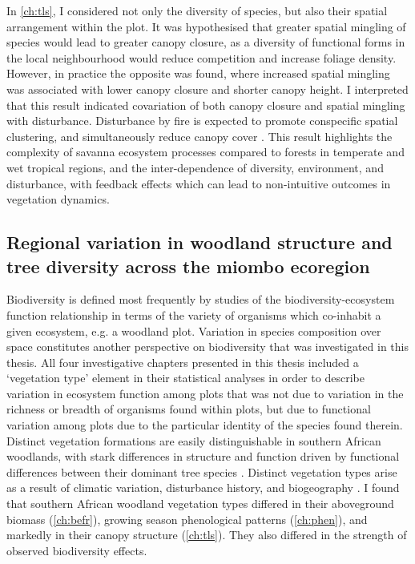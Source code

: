 \begin{refsection}
In \autoref{ch:tls}, I considered not only the diversity of species, but also their spatial arrangement within the plot. It was hypothesised that greater spatial mingling of species would lead to greater canopy closure, as a diversity of functional forms in the local neighbourhood would reduce competition and increase foliage density. However, in practice the opposite was found, where increased spatial mingling was associated with lower canopy closure and shorter canopy height. I interpreted that this result indicated covariation of both canopy closure and spatial mingling with disturbance. Disturbance by fire is expected to promote conspecific spatial clustering, and simultaneously reduce canopy cover \citep{}. This result highlights the complexity of savanna ecosystem processes compared to forests in temperate and wet tropical regions, and the inter-dependence of diversity, environment, and disturbance, with feedback effects which can lead to non-intuitive outcomes in vegetation dynamics.

\subsection{Regional variation in woodland structure and tree diversity across the miombo ecoregion}
\label{discussion:ssec:veg_type}

Biodiversity is defined most frequently by studies of the biodiversity-ecosystem function relationship in terms of the variety of organisms which co-inhabit a given ecosystem, e.g. a woodland plot. Variation in species composition over space constitutes another perspective on biodiversity that was investigated in this thesis. All four investigative chapters presented in this thesis included a `vegetation type' element in their statistical analyses in order to describe variation in ecosystem function among plots that was not due to variation in the richness or breadth of organisms found within plots, but due to functional variation among plots due to the particular identity of the species found therein. Distinct vegetation formations are easily distinguishable in southern African woodlands, with stark differences in structure and function driven by functional differences between their dominant tree species \citep{Solbrig1996}. Distinct vegetation types arise as a result of climatic variation, disturbance history, and biogeography \citep{Fayolle2018}. I found that southern African woodland vegetation types differed in their aboveground biomass (\autoref{ch:befr}), growing season phenological patterns (\autoref{ch:phen}), and markedly in their canopy structure (\autoref{ch:tls}). They also differed in the strength of observed biodiversity effects. 


\end{refsection}
